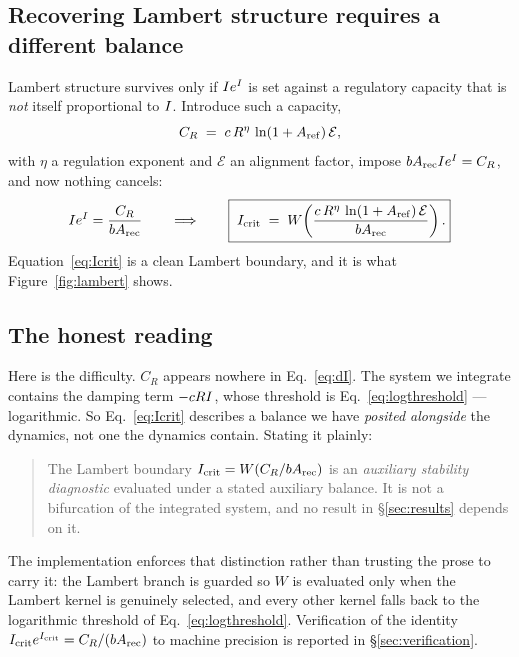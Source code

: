 \subsection{Recovering Lambert structure requires a different balance}

Lambert structure survives only if $I e^{I}$ is set against a regulatory
capacity that is \emph{not} itself proportional to $I$. Introduce such a
capacity,
\begin{equation}
  C_R \;=\; c\,R^{\eta}\,\ln(1 + A_{\mathrm{ref}})\,\mathcal{E},
  \label{eq:CR}
\end{equation}
with $\eta$ a regulation exponent and $\mathcal{E}$ an alignment factor, impose
$b A_{\mathrm{rec}} I e^{I} = C_R$, and now nothing cancels:
\begin{equation}
  I e^{I} = \frac{C_R}{b A_{\mathrm{rec}}}
  \qquad\Longrightarrow\qquad
  \boxed{\;I_{\mathrm{crit}} \;=\; W\!\left(\frac{c\,R^{\eta}\,\ln(1+A_{\mathrm{ref}})\,\mathcal{E}}{b A_{\mathrm{rec}}}\right).}
  \label{eq:Icrit}
\end{equation}
Equation~\eqref{eq:Icrit} is a clean Lambert boundary, and it is what
Figure~\ref{fig:lambert} shows.

\subsection{The honest reading}

Here is the difficulty. $C_R$ appears nowhere in Eq.~\eqref{eq:dI}. The system we
integrate contains the damping term $-cRI$, whose threshold is
Eq.~\eqref{eq:logthreshold} --- logarithmic. So Eq.~\eqref{eq:Icrit} describes a
balance we have \emph{posited alongside} the dynamics, not one the dynamics
contain. Stating it plainly:

\begin{quote}
The Lambert boundary $I_{\mathrm{crit}} = W(C_R / bA_{\mathrm{rec}})$ is an \emph{auxiliary stability
diagnostic} evaluated under a stated auxiliary balance. It is not a bifurcation
of the integrated system, and no result in \S\ref{sec:results} depends on it.
\Hypothetical
\end{quote}

The implementation enforces that distinction rather than trusting the prose to
carry it: the Lambert branch is guarded so $W$ is evaluated only when the
Lambert kernel is genuinely selected, and every other kernel falls back to the
logarithmic threshold of Eq.~\eqref{eq:logthreshold}. Verification of the
identity $I_{\mathrm{crit}} e^{I_{\mathrm{crit}}} = C_R/(bA_{\mathrm{rec}})$ to machine precision is reported in
\S\ref{sec:verification}.

